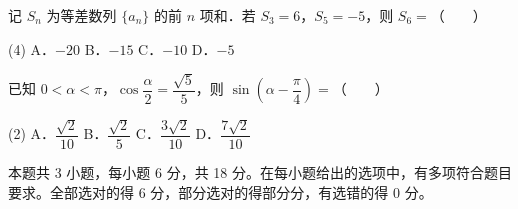\begin{question}
记 $S_n$ 为等差数列 $\{a_n\}$ 的前 $n$ 项和．若 $S_3=6$，$S_5=-5$，则 $S_6=$\mbox{（　　）}

\begin{gkopts}(4)
\task A．$-20$
\task B．$-15$
\task C．$-10$
\task D．$-5$
\end{gkopts}

\end{question}
\begin{question}
已知 $0<\alpha<\pi$，$\cos\dfrac{\alpha}{2}=\dfrac{\sqrt5}{5}$，则 $\sin\left(\alpha-\dfrac{\pi}{4}\right)=$\mbox{（　　）}

\begin{gkopts}(2)
\task A．$\dfrac{\sqrt2}{10}$
\task B．$\dfrac{\sqrt2}{5}$
\task C．$\dfrac{3\sqrt2}{10}$
\task D．$\dfrac{7\sqrt2}{10}$
\end{gkopts}

\par\medskip

\end{question}

\begin{gktip}
本题共 3 小题，每小题 6 分，共 18 分。在每小题给出的选项中，有多项符合题目要求。全部选对的得 6 分，部分选对的得部分分，有选错的得 0 分。
\end{gktip}


